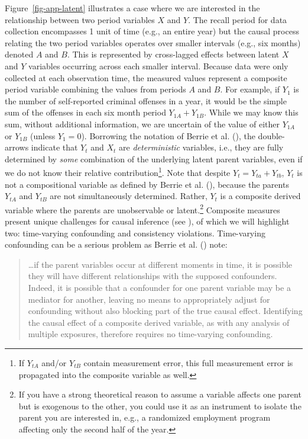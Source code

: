 \documentclass[
  letterpaper,
  DIV=11,
  numbers=noendperiod]{scrartcl}
\begin{document}
Figure~\ref{fig-app-latent} illustrates a case where we are interested
in the relationship between two period variables \(X\) and \(Y\). The
recall period for data collection encompasses 1 unit of time (e.g., an
entire year) but the causal process relating the two period variables
operates over smaller intervals (e.g., six months) denoted \(A\) and
\(B\). This is represented by cross-lagged effects between latent \(X\)
and \(Y\) variables occurring across each smaller interval. Because data
were only collected at each observation time, the measured values
represent a composite period variable combining the values from periods
\(A\) and \(B\). For example, if \(Y_1\) is the number of self-reported
criminal offenses in a year, it would be the simple sum of the offenses
in each six month period \(Y_{1A} + Y_{1B}\). While we may know this
sum, without additional information, we are uncertain of the value of
either \(Y_{1A}\) or \(Y_{1B}\) (unless \(Y_1=0\)). Borrowing the
notation of Berrie et al. (),
the double-arrows indicate that \(Y_t\) and \(X_t\) are
\emph{deterministic} variables, i.e., they are fully determined by
\emph{some} combination of the underlying latent parent variables, even
if we do not know their relative contribution\footnote{If \(Y_{tA}\)
  and/or \(Y_{tB}\) contain measurement error, this full measurement
  error is propagated into the composite variable as well.}. Note that
despite \(Y_t = Y_{ta} + Y_{tb}\), \(Y_t\) is not a compositional
variable as defined by Berrie et al.
(), because the parents
\(Y_{tA}\) and \(Y_{tB}\) are not simultaneously determined. Rather,
\(Y_t\) is a composite derived variable where the parents are
unobservable or latent.\footnote{If you have a strong theoretical reason
  to assume a variable affects one parent but is exogenous to the other,
  you could use it as an instrument to isolate the parent you are
  interested in, e.g., a randomized employment program affecting only
  the second half of the year.} Composite measures present unique
challenges for causal inference (see
), of which we
will highlight two: time-varying confounding and consistency violations.
Time-varying confounding can be a serious problem as Berrie et al.
() note:

\begin{quote}
\ldots if the parent variables occur at different moments in time, it is
possible they will have different relationships with the supposed
confounders. Indeed, it is possible that a confounder for one parent
variable may be a mediator for another, leaving no means to
appropriately adjust for confounding without also blocking part of the
true causal effect. Identifying the causal effect of a composite derived
variable, as with any analysis of multiple exposures, therefore requires
no time-varying confounding.
\end{quote}
\end{document}
